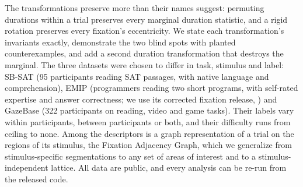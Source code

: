 \documentclass[11pt]{article}
\begin{document}
The transformations preserve more than their names suggest: permuting durations within a trial preserves every marginal duration statistic, and a rigid rotation preserves every fixation's eccentricity. We state each transformation's invariants exactly, demonstrate the two blind spots with planted counterexamples, and add a second duration transformation that destroys the marginal. The three datasets were chosen to differ in task, stimulus and label: SB-SAT \citep{ahn2020towards} (95 participants reading SAT passages, with native language and comprehension), EMIP \citep{bednarik2020emip} (programmers reading two short programs, with self-rated expertise and answer correctness; we use its corrected fixation release, \citealp{almadi2021emiptoolkit}) and GazeBase \citep{griffith2021gazebase} (322 participants on reading, video and game tasks). Their labels vary within participants, between participants or both, and their difficulty runs from ceiling to none. Among the descriptors is a graph representation of a trial on the regions of its stimulus, the Fixation Adjacency Graph, which we generalize from stimulus-specific segmentations to any set of areas of interest and to a stimulus-independent lattice. All data are public, and every analysis can be re-run from the released code.


\end{document}
